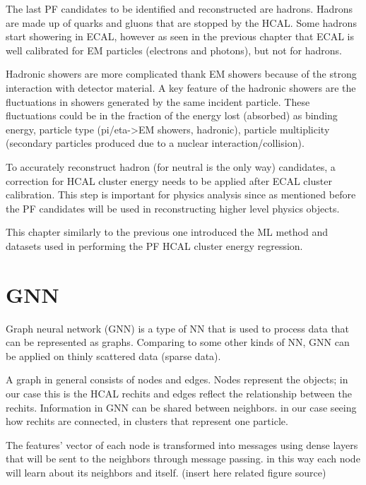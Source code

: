 The last PF candidates to be identified and reconstructed are hadrons. Hadrons are made up of quarks and gluons that are stopped by the HCAL. Some hadrons start showering in ECAL, however as seen in the previous chapter that ECAL is well calibrated for EM particles (electrons and photons), but not for hadrons.

Hadronic showers are more complicated thank EM showers because of the strong interaction with detector material. A key feature of the hadronic showers are the fluctuations in showers generated by the same incident particle. These fluctuations could be in the fraction of the energy lost (absorbed) as binding energy, particle type (pi/eta->EM showers, hadronic), particle multiplicity (secondary particles produced due to a nuclear interaction/collision). %

To accurately reconstruct hadron (for neutral is the only way) candidates, a correction for HCAL cluster energy needs to be applied after ECAL cluster calibration. This step is important for physics analysis since as mentioned before the PF candidates will be used in reconstructing higher level physics objects.

This chapter similarly to the previous one introduced the ML method and datasets used in performing the PF HCAL cluster energy regression.

\section{GNN} %

Graph neural network (GNN) is a type of NN that is used to process data that can be represented as graphs. Comparing to some other kinds of NN, GNN can be applied on thinly scattered data (sparse data).

A graph in general consists of nodes and edges. Nodes represent the objects; in our case this is the HCAL rechits and edges reflect the relationship between the rechits. Information in GNN can be shared between neighbors. in our case seeing how rechits are connected, in clusters that represent one particle.

The features’ vector of each node is transformed into messages using dense layers that will be sent to the neighbors through message passing.  in this way each node will learn about its neighbors and itself. (insert here related figure source) 


